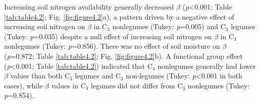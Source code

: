 Increasing soil nitrogen availability generally decreased $\beta$  (\textit{p}<0.001; Table \ref{tab:table4.2}; Fig. \ref{fig:figure4.2}a), a pattern driven by a negative effect of increasing soil nitrogen on $\beta$  in C$_3$ nonlegumes (Tukey: \textit{p}=0.005) and C$_3$ legumes (Tukey: \textit{p}=0.035) despite a null effect of increasing soil nitrogen on $\beta$ in C$_4$ nonlegumes (Tukey: \textit{p}=0.856). There was no effect of soil moisture on $\beta$  (\textit{p}=0.872; Table \ref{tab:table4.2}; Fig. \ref{fig:figure4.2}b). A functional group effect (\textit{p}<0.001; Table \ref{tab:table4.2}) indicated that C$_4$ nonlegumes generally had lower $\beta$ values than both C$_3$ legumes and C$_3$ non-legumes (Tukey: \textit{p}<0.001 in both cases), while $\beta$ values in C$_3$ legumes did not differ from C$_3$ nonlegumes (Tukey: \textit{p}=0.854).


